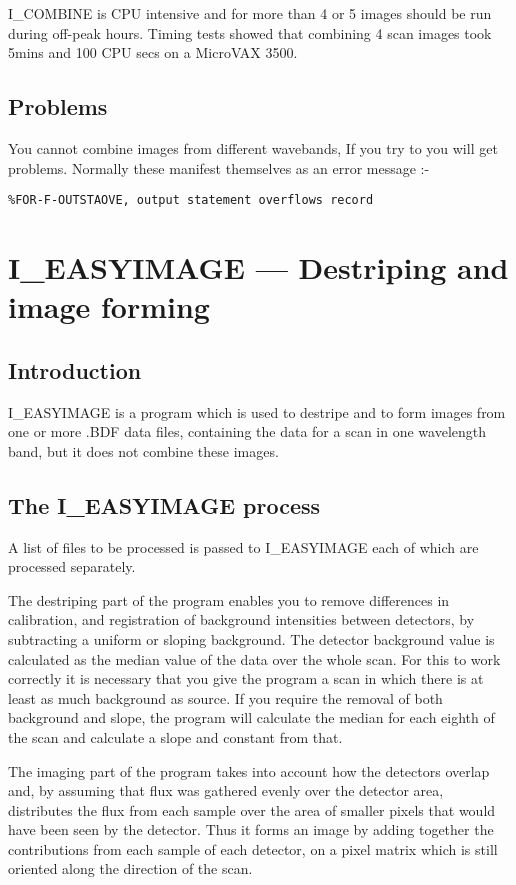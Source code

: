 I\_COMBINE is CPU intensive and for more than 4 or 5 images should be run
during off-peak hours. Timing tests showed that combining 4 scan images
took 5mins and 100 CPU secs on a MicroVAX 3500.

\subsection {Problems}

You cannot combine images from different wavebands, If you try to you will get
problems. Normally these manifest themselves as an error message :-
\begin{verbatim}
%FOR-F-OUTSTAOVE, output statement overflows record
\end{verbatim}
\pagebreak

\section{I\_EASYIMAGE --- Destriping and image forming}

\subsection {Introduction}

I\_EASYIMAGE is a program which is used to destripe and to form images from one
or more .BDF data files, containing the data for a scan in one wavelength band,
but it does not combine these images.

\subsection {The I\_EASYIMAGE process}

A list of files to be processed is passed to I\_EASYIMAGE each of which are
processed separately.

The destriping part of the program enables you to remove differences in
calibration, and registration of background intensities between detectors,
by subtracting a uniform or sloping background. The detector background value
is calculated as the median value of the data over the whole scan. For this to
work correctly it is necessary that you give the program a scan in which there
is at least as much background as source. If you require the removal of both
background and slope, the program will calculate the median for each eighth of
the scan and calculate a slope and constant from that.

The imaging part of the program takes into account how the detectors
overlap and, by assuming that flux was gathered evenly over the detector area,
distributes the flux from each sample over the area of smaller pixels that
would have been seen by the detector. Thus it forms an image by adding
together the contributions from each sample of each detector, on a pixel matrix
which is still oriented along the direction of the scan.

